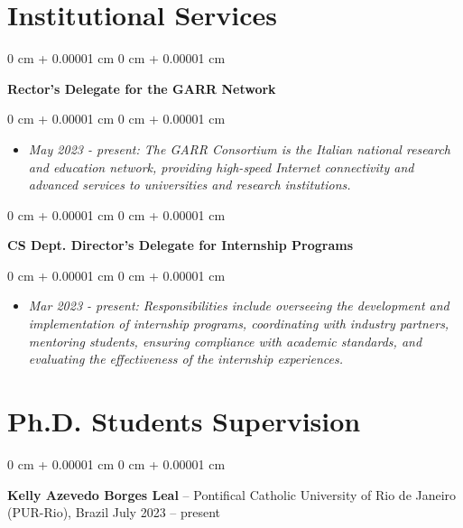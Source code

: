 \documentclass[10pt, a4paper]{article}
\newenvironment{highlights}{
    \begin{itemize}[
        topsep=0.10 cm,
        parsep=0.10 cm,
        partopsep=0pt,
        itemsep=0pt,
        leftmargin=0 cm + 10pt
    ]
}{
    \end{itemize}
} %
\newenvironment{onecolentry}{
    \begin{adjustwidth}{
        0 cm + 0.00001 cm
    }{
        0 cm + 0.00001 cm
    }
}{
    \end{adjustwidth}
} %
\newenvironment{twocolentry}[2][]{
    \onecolentry
    \def\secondColumn{#2}
    \setcolumnwidth{\fill, 4.5 cm}
    \begin{paracol}{2}
}{
    \switchcolumn \raggedleft \secondColumn
    \end{paracol}
    \endonecolentry
} %
\begin{document}
    
    \section{Institutional Services}



        
        \begin{onecolentry}
            \textbf{Rector’s Delegate for the GARR Network}\end{onecolentry}

        \vspace{0.10 cm}
        \begin{onecolentry}
            \begin{highlights}
                \item \textit{May 2023 - present: The GARR Consortium is the Italian national research and education network, providing high-speed Internet connectivity and advanced services to universities and research institutions.}
            \end{highlights}
        \end{onecolentry}


        \vspace{0.2 cm}

        \begin{onecolentry}
            \textbf{CS Dept. Director’s Delegate for Internship Programs}\end{onecolentry}

        \vspace{0.10 cm}
        \begin{onecolentry}
            \begin{highlights}
                \item \textit{Mar 2023 - present: Responsibilities include overseeing the development and implementation of internship programs, coordinating with industry partners, mentoring students, ensuring compliance with academic standards, and evaluating the effectiveness of the internship experiences.}
            \end{highlights}
        \end{onecolentry}



    
    \section{Ph.D. Students Supervision}



        
        \begin{twocolentry}{
            July 2023 – present
        }
            \textbf{Kelly Azevedo Borges Leal} -- Pontifical Catholic University of Rio de Janeiro (PUR-Rio), Brazil\end{twocolentry}
\end{document}
